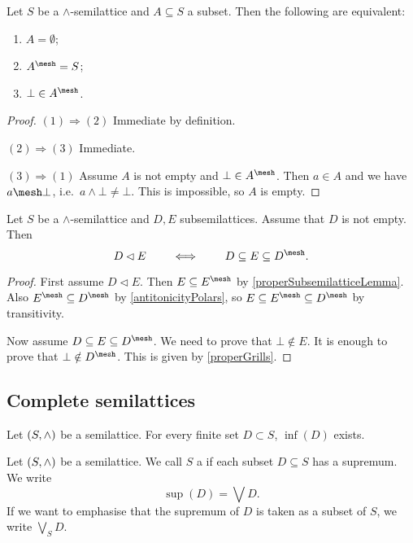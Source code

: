 \begin{lemma} \label{properGrills}
Let $S$ be a $\wedge$-semilattice and $A\subseteq S$ a subset. Then the following are equivalent:
\begin{enumerate}
\item $A = \emptyset$;
\item $A^\mesh = S$;
\item $\bot \in A^\mesh$.
\end{enumerate}
\end{lemma}
\begin{proof}
$(1) \Rightarrow (2)$ Immediate by definition.

$(2) \Rightarrow (3)$ Immediate.

$(3) \Rightarrow (1)$ Assume $A$ is not empty and $\bot\in A^\mesh$. Then $a\in A$ and we have $a \mesh \bot$, i.e.\ $a\wedge \bot \neq \bot$. This is impossible, so $A$ is empty.
\end{proof}

\begin{proposition}
Let $S$ be a $\wedge$-semilattice and $D,E$ subsemilattices. Assume that $D$ is not empty. Then
\[ D \lhd E \qquad\iff\qquad D\subseteq E \subseteq D^\mesh. \]
\end{proposition}
\begin{proof}
First assume $D \lhd E$. Then $E\subseteq E^\mesh$ by \ref{properSubsemilatticeLemma}. Also $E^\mesh \subseteq D^\mesh$ by \ref{antitonicityPolars}, so $E\subseteq E^\mesh \subseteq D^\mesh$ by transitivity.

Now assume $D\subseteq E \subseteq D^\mesh$. We need to prove that $\bot\notin E$. It is enough to prove that $\bot \notin D^\mesh$. This is given by \ref{properGrills}.
\end{proof}

\subsection{Complete semilattices}
\begin{lemma}
Let $\left( S,\wedge \right)$ be a semilattice. For every finite set $D\subset S$, $\inf(D)$ exists.
\end{lemma}
\begin{definition}
Let $\left( S,\wedge \right)$ be a semilattice. We call $S$ a  if each subset $D\subseteq S$ has a supremum. We write
\[ \sup(D) = \bigvee D. \]
If we want to emphasise that the supremum of $D$ is taken as a subset of $S$, we write $\bigvee_S D$.
\end{definition}

